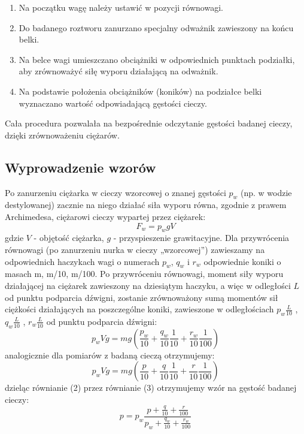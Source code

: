 \documentclass{article} %
\begin{document}
\begin{enumerate}
    \item Na początku wagę należy ustawić w pozycji równowagi.
    \item Do badanego roztworu zanurzano specjalny odważnik zawieszony na końcu belki.
    \item Na belce wagi umieszczano obciążniki w odpowiednich punktach podziałki, aby zrównoważyć siłę wyporu działającą na odważnik.
    \item Na podstawie położenia obciążników (koników) na podziałce belki wyznaczano wartość odpowiadającą gęstości cieczy.
\end{enumerate}


Cała procedura pozwalała na bezpośrednie odczytanie gęstości badanej cieczy, dzięki zrównoważeniu ciężarów.

\subsection{Wyprowadzenie wzorów}

Po zanurzeniu ciężarka w cieczy wzorcowej o znanej gęstości $p_w$ (np. w wodzie
destylowanej) zacznie na niego działać siła wyporu równa, zgodnie z prawem
Archimedesa, ciężarowi cieczy wypartej przez ciężarek:
{\large
    \begin{equation}
    F_w = p_wgV    
    \end{equation}
}
gdzie $V$ - objętość ciężarka, $g$ - przyspieszenie grawitacyjne.  Dla przywrócenia równowagi (po zanurzeniu nurka w cieczy „wzorcowej”) zawieszamy na odpowiednich haczykach wagi o numerach $p_w$, 
$q_w$ i $r_w$ odpowiednie koniki o masach m, m/10, m/100. Po przywróceniu równowagi,
moment siły wyporu działającej na ciężarek zawieszony na dziesiątym haczyku,
a więc w odległości $L$ od punktu podparcia dźwigni, zostanie zrównoważony sumą momentów sił ciężkości działających na poszczególne koniki, zawieszone w
odległościach $p_w \frac{L}{10}$ , $q_w \frac{L}{10}$ , $r_w \frac{L}{10}$ od punktu podparcia dźwigni:
{\large
    \begin{equation}
    p_wVg = mg(\frac{p_w}{10}+\frac{q_w}{10}\frac{1}{10}+\frac{r_w}{10}\frac{1}{100})
    \end{equation}
}
analogicznie dla pomiarów z badaną cieczą otrzymujemy:
{\large
    \begin{equation}
    p_wVg = mg(\frac{p}{10}+\frac{q}{10}\frac{1}{10}+\frac{r}{10}\frac{1}{100})
    \end{equation}
}
dzieląc równianie (2) przez równianie (3) otrzymujemy wzór na gęstość badanej cieczy:
{\large
    \begin{equation}
    p = p_w\frac{p+\frac{q}{10}+\frac{r}{100}}{p_w+\frac{q_w}{10}+\frac{r_w}{100}}
    \end{equation}
}
\end{document}

